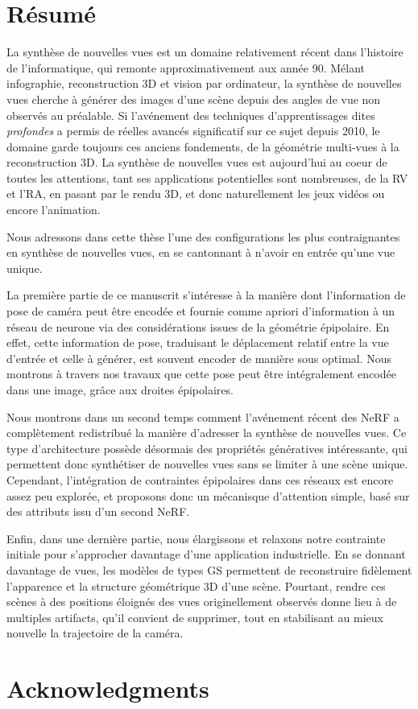 \chapter{R\'esum\'e}

La synthèse de nouvelles vues est un domaine relativement récent dans l'histoire de l'informatique, qui remonte approximativement aux année 90. Mélant infographie, reconstruction 3D et vision par ordinateur, la synthèse de nouvelles vues cherche à générer des images d'une scène depuis des angles de vue non observés au préalable. Si l'avénement des techniques d'apprentissages dites \textit{profondes} a permis de réelles avancés significatif sur ce sujet depuis 2010, le domaine garde toujours ces anciens fondements, de la géométrie multi-vues à la reconstruction 3D. La synthèse de nouvelles vues est aujourd'hui au coeur de toutes les attentions, tant ses applications potentielles sont nombreuses, de la \ac{RV} et l'\ac{RA}, en pasant par le rendu 3D, et donc naturellement les jeux vidéos ou encore l'animation.

Nous adressons dans cette thèse l'une des configurations les plus contraignantes en synthèse de nouvelles vues, en se cantonnant à n'avoir en entrée qu'une vue unique. 

La première partie de ce manuscrit s'intéresse à la manière dont l'information de pose de caméra peut être encodée et fournie comme apriori d'information à un réseau de neurone via des considérations issues de la géométrie épipolaire. En effet, cette information de pose, traduisant le déplacement relatif entre la vue d'entrée et celle à générer, est souvent encoder de manière sous optimal. Nous montrons à travers nos travaux que cette pose peut être intégralement encodée dans une image, grâce aux droites épipolaires. 

Nous montrons dans un second temps comment l'avénement récent des \ac{NeRF} a complètement redistribué la manière d'adresser la synthèse de nouvelles vues. Ce type d'architecture possède désormais des propriétés génératives intéressante, qui permettent donc synthétiser de nouvelles vues sans se limiter à une scène unique. Cependant, l'intégration de contraintes épipolaires dans ces réseaux est encore assez peu explorée, et proposons donc un mécanisque d'attention simple, basé sur des attributs issu d'un second \ac{NeRF}. 

Enfin, dans une dernière partie, nous élargissons et relaxons notre contrainte initiale pour s'approcher davantage d'une application industrielle. En se donnant davantage de vues, les modèles de types \ac{GS} permettent de reconstruire fidèlement l'apparence et la structure géométrique 3D d'une scène. Pourtant, rendre ces scènes à des positions éloignés des vues originellement observés donne lieu à de multiples artifacts, qu'il convient de supprimer, tout en stabilisant au mieux nouvelle la trajectoire de la caméra. 


\cleardoublepage
\chapter{Acknowledgments}



